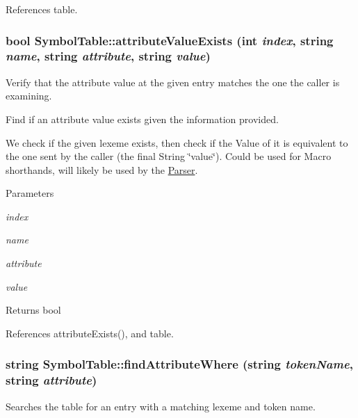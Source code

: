 References table.

\hypertarget{classSymbolTable_a7df0fef90bee097810b553ad2e1c6cec}{
\subsubsection[{attributeValueExists}]{\setlength{\rightskip}{0pt plus 5cm}bool SymbolTable::attributeValueExists (int {\em index}, \/  string {\em name}, \/  string {\em attribute}, \/  string {\em value})}}
\label{classSymbolTable_a7df0fef90bee097810b553ad2e1c6cec}


Verify that the attribute value at the given entry matches the one the caller is examining. 

Find if an attribute value exists given the information provided.

We check if the given lexeme exists, then check if the Value of it is equivalent to the one sent by the caller (the final String \char`\"{}value\char`\"{}). Could be used for Macro shorthands, will likely be used by the \hyperlink{classParser}{Parser}.


\begin{DoxyParams}{Parameters}
\item[{\em index}]\item[{\em name}]\item[{\em attribute}]\item[{\em value}]\end{DoxyParams}
\begin{DoxyReturn}{Returns}
bool 
\end{DoxyReturn}


References attributeExists(), and table.

\hypertarget{classSymbolTable_a0b0bdb5b1a6095782c6c4f318737a0a9}{
\subsubsection[{findAttributeWhere}]{\setlength{\rightskip}{0pt plus 5cm}string SymbolTable::findAttributeWhere (string {\em tokenName}, \/  string {\em attribute})}}
\label{classSymbolTable_a0b0bdb5b1a6095782c6c4f318737a0a9}


Searches the table for an entry with a matching lexeme and token name. 

